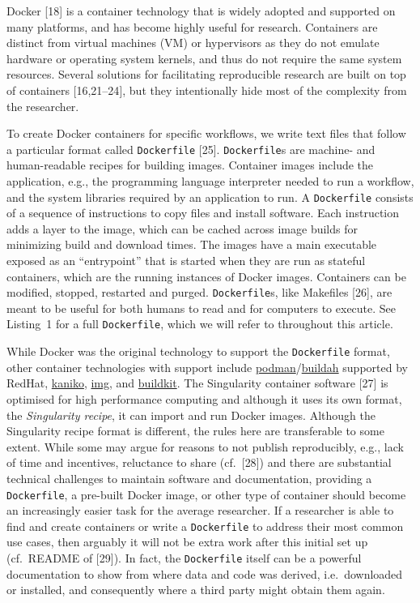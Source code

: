 \documentclass[10pt,letterpaper]{article}
\begin{document}
Docker {[}18{]} is a container technology that is widely adopted and
supported on many platforms, and has become highly useful for research.
Containers are distinct from virtual machines (VM) or hypervisors as
they do not emulate hardware or operating system kernels, and thus do
not require the same system resources. Several solutions for
facilitating reproducible research are built on top of containers
{[}16,21--24{]}, but they intentionally hide most of the complexity from
the researcher.

To create Docker containers for specific workflows, we write text files
that follow a particular format called \texttt{Dockerfile} {[}25{]}.
\texttt{Dockerfile}s are machine- and human-readable recipes for
building images. Container images include the application, e.g., the
programming language interpreter needed to run a workflow, and the
system libraries required by an application to run. A
\texttt{Dockerfile} consists of a sequence of instructions to copy files
and install software. Each instruction adds a layer to the image, which
can be cached across image builds for minimizing build and download
times. The images have a main executable exposed as an ``entrypoint''
that is started when they are run as stateful containers, which are the
running instances of Docker images. Containers can be modified, stopped,
restarted and purged. \texttt{Dockerfile}s, like Makefiles {[}26{]}, are
meant to be useful for both humans to read and for computers to execute.
See Listing~1 for a full \texttt{Dockerfile}, which we will refer to
throughout this article.

While Docker was the original technology to support the
\texttt{Dockerfile} format, other container technologies with support
include
\href{https://podman.io/}{podman}/\href{https://github.com/containers/buildah}{buildah}
supported by RedHat,
\href{https://github.com/GoogleContainerTools/kaniko}{kaniko},
\href{https://github.com/genuinetools/img}{img}, and
\href{https://github.com/moby/buildkit}{buildkit}. The Singularity
container software {[}27{]} is optimised for high performance computing
and although it uses its own format, the \emph{Singularity recipe}, it
can import and run Docker images. Although the Singularity recipe format
is different, the rules here are transferable to some extent. While some
may argue for reasons to not publish reproducibly, e.g., lack of time
and incentives, reluctance to share (cf.~{[}28{]}) and there are
substantial technical challenges to maintain software and documentation,
providing a \texttt{Dockerfile}, a pre-built Docker image, or other type
of container should become an increasingly easier task for the average
researcher. If a researcher is able to find and create containers or
write a \texttt{Dockerfile} to address their most common use cases, then
arguably it will not be extra work after this initial set up (cf.~README
of {[}29{]}). In fact, the \texttt{Dockerfile} itself can be a powerful
documentation to show from where data and code was derived,
i.e.~downloaded or installed, and consequently where a third party might
obtain them again.
\end{document}
